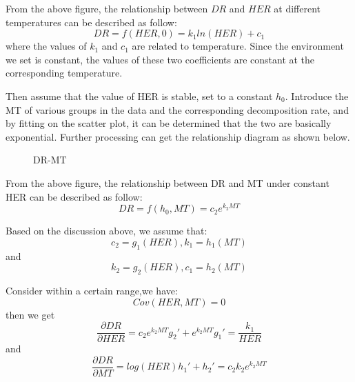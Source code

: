 \documentclass{mcmthesis}
\begin{document}
From the above figure, the relationship between $DR$ and $HER$ at different temperatures can be described as follow:
\begin{equation} 
	DR=f(HER,0)=k_{1}ln(HER)+c_{1}
\end{equation}
where the values of $k_{1}$ and $c_{1}$ are related to temperature. Since the environment we set is constant, the values of these two coefficients are constant at the corresponding temperature.

Then assume that the value of HER is stable, set to a constant $h_{0}$. Introduce the MT of various groups in the data and the corresponding decomposition rate, and by fitting on the scatter plot, it can be determined that the two are basically exponential. Further processing can get the relationship diagram as shown below.
\begin{figure}[h]
	\caption{DR-MT}
\end{figure}

From the above figure, the relationship between DR and MT under constant HER can be described as follow: 
\begin{equation} 
	DR=f(h_{0},MT)=c_{2}e^{k_{2}MT}
\end{equation}

Based on the discussion above, we assume that:
\begin{equation} 
	c_{2}=g_{1}(HER), k_{1}=h_{1}(MT)
\end{equation}
and 
\begin{equation} 
	k_{2}=g_{2}(HER), c_{1}=h_{2}(MT)
\end{equation}

Consider within a certain range,we have:
\begin{equation} 
	Cov(HER,MT)=0
\end{equation}
then we get
\begin{equation} 
	\frac{{\partial}DR}{{\partial}HER}=c_{2}e^{k_{2}MT}g_{2}'+e^{k_{2}MT}g_{1}'=\frac{k_{1}}{HER}
\end{equation}
and
\begin{equation} 
	\frac{{\partial}DR}{{\partial}MT}=log(HER)h_{1}'+h_{2}'=c_{2}k_{2}e^{k_{2}MT}
\end{equation}
\end{document}
